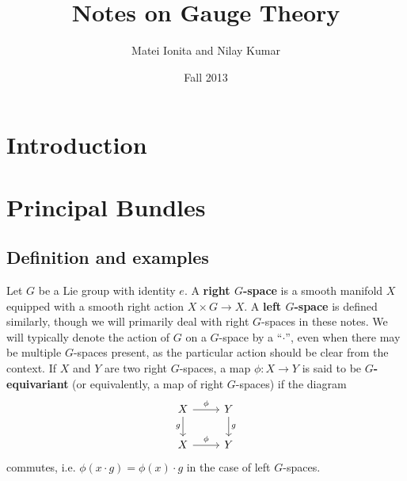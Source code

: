 \documentclass{book}
\title{Notes on Gauge Theory}
\author{Matei Ionita and Nilay Kumar}
\date{Fall 2013}
\theoremstyle{plain}
\theoremstyle{definition}
\theoremstyle{remark}
\begin{document}
\maketitle

\tableofcontents

\hypersetup{linkcolor=blue}

\setcounter{chapter}{-1}

\newpage

\chapter{Introduction}


\chapter{Principal Bundles}

\section{Definition and examples}

Let $G$ be a Lie group with identity $e$. A \textbf{right $G$-space} is a smooth manifold $X$ equipped with a smooth right action $X\times G\to X$. 
A \textbf{left $G$-space} is defined similarly, though we will primarily deal with right $G$-spaces in these notes.
We will typically denote the action of $G$ on a $G$-space by a ``$\cdot$'', even when there may
be multiple $G$-spaces present, as the particular action should be clear from the context.
If $X$ and $Y$ are two right $G$-spaces, a map $\phi:X\to Y$ is said to be \textbf{$G$-equivariant} (or equivalently, a map of right $G$-spaces) if the diagram
\[\begin{tikzcd}
        X\arrow[swap]{d}{g}\arrow{r}{\phi}&Y\arrow{d}{g}\\
        X\arrow{r}{\phi}&Y
\end{tikzcd}\]
commutes, i.e. $\phi(x\cdot g)=\phi(x)\cdot g$ in the case of left $G$-spaces.
\end{document}
